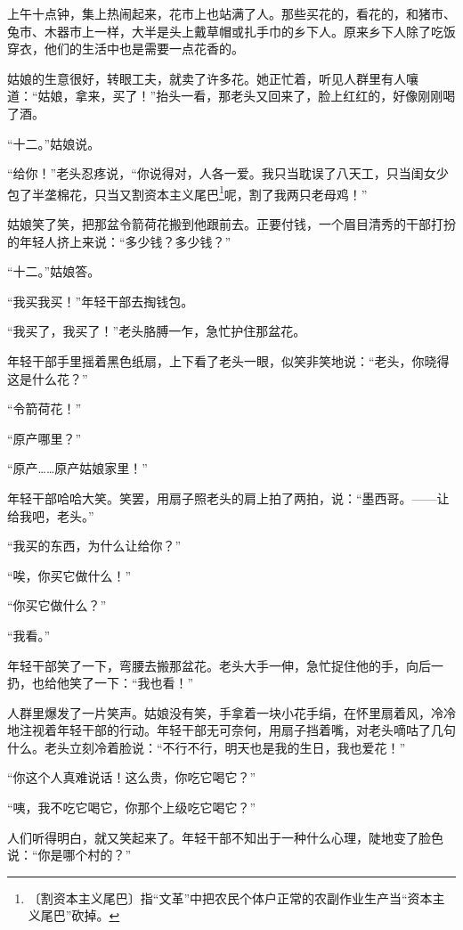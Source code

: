 \documentclass[12pt,UTF-8,openany]{ctexbook}
\begin{document}
\begin{normalsize}
    上午十点钟，集上热闹起来，花市上也站满了人。那些买花的，看花的，和猪市、兔市、木器市上一样，大半是头上戴草帽或扎手巾的乡下人。原来乡下人除了吃饭穿衣，他们的生活中也是需要一点花香的。
    
    姑娘的生意很好，转眼工夫，就卖了许多花。她正忙着，听见人群里有人嚷道：“姑娘，拿来，买了！”抬头一看，那老头又回来了，脸上红红的，好像刚刚喝了酒。
    
    “十二。”姑娘说。
    
    “给你！”老头忍疼说，“你说得对，人各一爱。我只当耽误了八天工，只当闺女少包了半垄棉花，只当又割资本主义尾巴\footnote{〔割资本主义尾巴〕指“文革”中把农民个体户正常的农副作业生产当“资本主义尾巴”砍掉。}呢，割了我两只老母鸡！”
    
    姑娘笑了笑，把那盆令箭荷花搬到他跟前去。正要付钱，一个眉目清秀的干部打扮的年轻人挤上来说：“多少钱？多少钱？”
    
    “十二。”姑娘答。
    
    “我买我买！”年轻干部去掏钱包。
    
    “我买了，我买了！”老头胳膊一乍，急忙护住那盆花。
    
    年轻干部手里摇着黑色纸扇，上下看了老头一眼，似笑非笑地说：“老头，你晓得这是什么花？”
    
    “令箭荷花！”
    
    “原产哪里？”
    
    “原产……原产姑娘家里！”
    
    年轻干部哈哈大笑。笑罢，用扇子照老头的肩上拍了两拍，说：“墨西哥。——让给我吧，老头。”
    
    “我买的东西，为什么让给你？”
    
    “唉，你买它做什么！”
    
    “你买它做什么？”
    
    “我看。”
    
    年轻干部笑了一下，弯腰去搬那盆花。老头大手一伸，急忙捉住他的手，向后一扔，也给他笑了一下：“我也看！”
    
    人群里爆发了一片笑声。姑娘没有笑，手拿着一块小花手绢，在怀里扇着风，冷冷地注视着年轻干部的行动。年轻干部无可奈何，用扇子挡着嘴，对老头嘀咕了几句什么。老头立刻冷着脸说：“不行不行，明天也是我的生日，我也爱花！”
    
    “你这个人真难说话！这么贵，你吃它喝它？”
    
    “咦，我不吃它喝它，你那个上级吃它喝它？”
    
    人们听得明白，就又笑起来了。年轻干部不知出于一种什么心理，陡地变了脸色说：“你是哪个村的？”
    

\end{normalsize}
\end{document}
